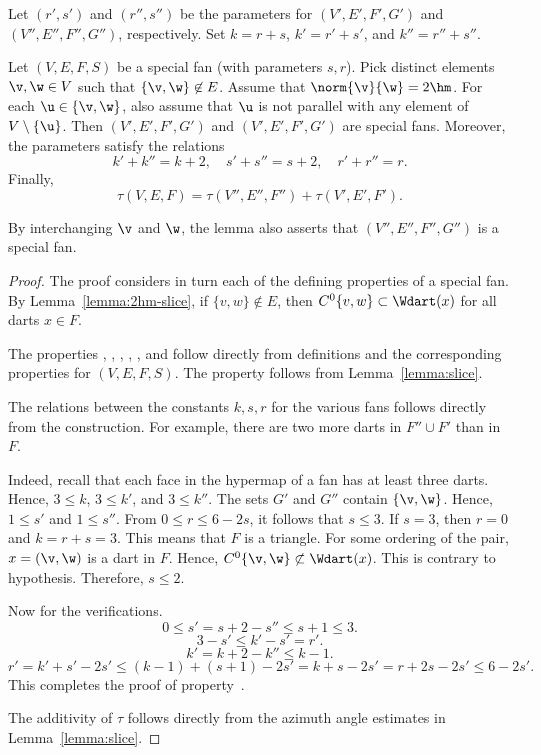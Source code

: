 Let $(r',s')$ and $(r'',s'')$ be the parameters for $(V',E',F',G')$
and $(V'',E'',F'',G'')$, respectively.  Set $k=r+s$, $k'=r'+s'$, and
$k''=r''+s''$.

\begin{lemma}
\label{lemma:param-add}  
Let $(V,E,F,S)$ be a special fan (with parameters $s,r$).  Pick
distinct elements $\v,\w\in V$ such that $\{\v,\w\}\not\in E$.
Assume that $\norm{\v}{\w}=2\hm$.  For each $\u\in \{\v,\w\}$,
also assume that $\u$ is not parallel with any element of 
$V\setminus\{\u\}$.
Then $(V',E',F',G')$ and $(V',E',F',G')$ are special fans.  Moreover,
the parameters satisfy the relations
\[ 
k'+k'' = k + 2,\quad s'+s'' = s + 2,\quad r'+r''=r.
\] 
Finally,
\[ 
\tau(V,E,F)= \tau(V'',E'',F'') +\tau(V',E',F').
\] 
\end{lemma}

By interchanging $\v$ and $\w$, the lemma also asserts that
$(V'',E'',F'',G'')$ is a special fan.

\begin{proof} The proof considers in turn each of the defining properties of a
  special fan.  By Lemma~\ref{lemma:2hm-slice}, if
  $\{v,w\}\not\in E$, then $C^0\{v,w\}\subset \Wdart(x)$ for all darts
  $x\in F$.

The properties , , ,
, , and  follow directly from
definitions and the corresponding properties for $(V,E,F,S)$.  The
property  follows from Lemma~\ref{lemma:slice}.

The relations between the constants $k,s,r$ for the various fans
follows directly from the construction.  For example, there are two
more darts in $F''\cup F'$ than in $F$.

  Indeed, recall that each face
in the hypermap of a fan has at least three darts.  Hence, $3\le k$,
$3\le k'$, and $3\le k''$.  The sets $G'$ and $G''$ contain
$\{\v,\w\}$.  Hence, $1\le s'$ and $1\le s''$.  From $0\le r\le 6 -
2s$, it follows that $s\le 3$.  If $s=3$, then $r=0$ and $k=r+s=3$.
This means that $F$ is a triangle.  For some ordering of the pair,
$x=(\v,\w)$ is a dart in $F$.  Hence, $C^0\{\v,\w\} \not\subset
\Wdart(x)$.  This is contrary to hypothesis.  Therefore, $s\le 2$.

Now for the verifications.
\[ 0\le s' = s + 2 - s'' \le s+1\le 3.\] 
\[ 3-s'\le k'-s' = r'.\] 
\[ k' = k + 2 - k'' \le k-1.\] 
\[ 
  r'= k'+s' - 2 s' \le (k-1) + (s+1) - 2s' 
  =k+s - 2s' = r + 2s -2s' \le 6 - 2s'.
\] 
This completes the proof of property~.

The additivity of $\tau$ follows directly from the azimuth angle
estimates in Lemma~\ref{lemma:slice}.
\end{proof}


